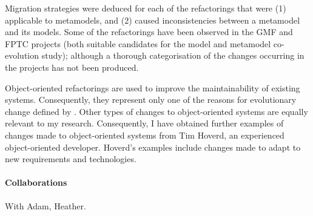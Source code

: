 Migration strategies were deduced for each of the refactorings that were (1) applicable to metamodels, and (2) caused inconsistencies between a metamodel and its models. Some of the refactorings have been observed in the GMF and FPTC projects (both suitable candidates for the model and metamodel co-evolution study); although a thorough categorisation of the changes occurring in the projects has not been produced.

Object-oriented refactorings are used to improve the maintainability of existing systems. Consequently, they represent only one of the reasons for evolutionary change defined by \cite{sjoberg93quantifying}. Other types of changes to object-oriented systems are equally relevant to my research. Consequently, I have obtained further examples of changes made to object-oriented systems from Tim Hoverd, an experienced object-oriented developer. Hoverd's examples include changes made to adapt to new requirements and technologies.



\paragraph{Collaborations} %
\label{par:collaborations}
With Adam, Heather.







